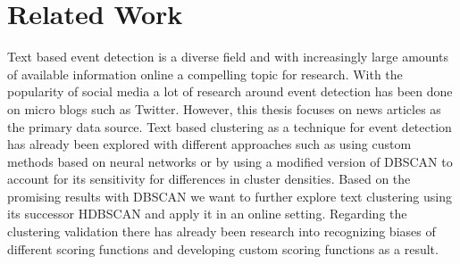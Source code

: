 \section{Related Work}

Text based event detection is a diverse field and with increasingly large amounts of available information online a compelling topic for research.
With the popularity of social media a lot of research around event detection has been done on micro blogs\cite{microblog_clustering} such as Twitter\cite{twitter_survey}\cite{social_media_survey}.
However, this thesis focuses on news articles as the primary data source.
Text based clustering as a technique for event detection has already been explored with different approaches such as using custom methods based on neural networks\cite{text_clustering_topic_detection}
or by using a modified version of DBSCAN to account for its sensitivity for differences in cluster densities\cite{dbscan_martingale}.
Based on the promising results with DBSCAN we want to further explore text clustering using its successor HDBSCAN\cite{McInnes2017} and apply it in an online setting.
Regarding the clustering validation there has already been research into recognizing biases of different scoring functions \cite{Wu:2009:ARM:1557019.1557115}
and developing custom scoring functions as a result\cite{gates2017comparing}.
